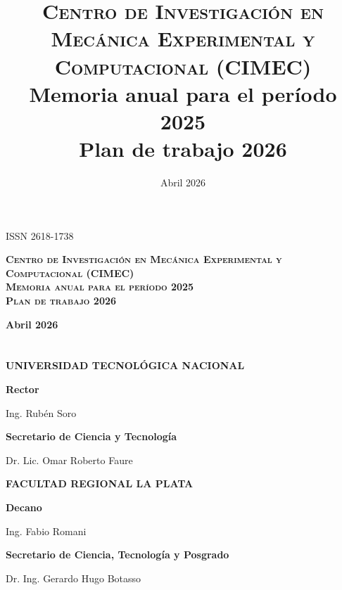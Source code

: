 \documentclass[a4paper,11pt,twoside,final,titlepage,onecolumn,openright]{report}
\begin{document}
\title{\textsc{Centro de Investigación en Mecánica Experimental y Computacional (CIMEC)}\\
	Memoria anual para el período 2025 \\
	Plan de trabajo 2026}
\date{Abril 2026}


\chapter*{}

\begin{flushright}
	ISSN 2618-1738
\end{flushright}

\vspace{5cm}
\begin{center}

	\textbf{\LARGE \textsc{Centro de Investigación en Mecánica Experimental y Computacional (CIMEC)} \\[1em] \textsc{Memoria anual para el período 2025} \\[1em] \textsc{Plan de trabajo 2026}}

	\vspace{1cm}
	\textbf{\Large Abril 2026}
\end{center}


\chapter*{}

\begin{center}

	\textbf{\LARGE UNIVERSIDAD TECNOLÓGICA NACIONAL}

	\vspace{1cm}
	\textbf{\Large Rector}

	Ing. Rubén Soro

	\vspace{0.5cm}
	\textbf{\Large Secretario de Ciencia y Tecnología}

	Dr. Lic. Omar Roberto Faure

	\vspace{5cm}

	\textbf{\LARGE FACULTAD REGIONAL LA PLATA}

	\vspace{1cm}
	\textbf{\Large Decano}

	Ing. Fabio Romani

	\vspace{0.5cm}
	\textbf{\Large Secretario de Ciencia, Tecnología y Posgrado}

	Dr. Ing. Gerardo Hugo Botasso

\end{center}
\end{document}
